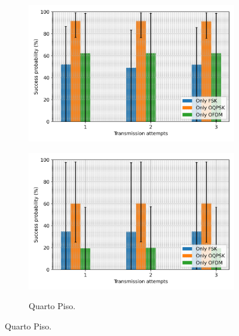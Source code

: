 \begin{figure}[ht!]
\begin{subfigure}{.4\textwidth}
            \includegraphics[width=\textwidth]{./sections/textual/chapters/images/mod_3_floor.png}
            \label{fig:piso3}
      \end{subfigure}
      \begin{subfigure}{.4\textwidth}
            \centering
            \caption{Quarto Piso.}
            \includegraphics[width=\textwidth]{./sections/textual/chapters/images/mod_4_floor.png}
            \label{fig:piso4}
      \end{subfigure}
      \label{fig:pdr_andar}
\end{figure}


